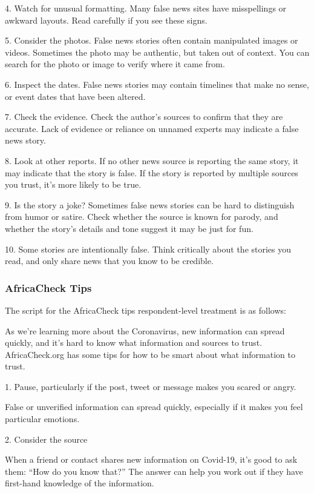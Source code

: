 \documentclass[letterpaper, 12pt, parskip=full,]{scrartcl}
\begin{document}
4. Watch for unusual formatting. Many false news sites have misspellings or awkward layouts. Read carefully if you see these signs.

5. Consider the photos. False news stories often contain manipulated images or videos. Sometimes the photo may be authentic, but taken out of context. You can search for the photo or image to verify where it came from.

6. Inspect the dates. False news stories may contain timelines that make no sense, or event dates that have been altered.

7. Check the evidence. Check the author's sources to confirm that they are accurate. Lack of evidence or reliance on unnamed experts may indicate a false news story.

8. Look at other reports. If no other news source is reporting the same story, it may indicate that the story is false. If the story is reported by multiple sources you trust, it's more likely to be true.

9. Is the story a joke? Sometimes false news stories can be hard to distinguish from humor or satire. Check whether the source is known for parody, and whether the story's details and tone suggest it may be just for fun.

10. Some stories are intentionally false. Think critically about the stories you read, and only share news that you know to be credible.



\subsubsection{AfricaCheck Tips}\label{sec:actips}
The script for the AfricaCheck tips respondent-level treatment is as follows:

As we're learning more about the Coronavirus, new information can spread quickly, and it's hard to know what information and sources to trust. AfricaCheck.org has some tips for how to be smart about what information to trust. 

1. Pause, particularly if the post, tweet or message makes you scared or angry. 

False or unverified information can spread quickly, especially if it makes you feel particular emotions.

2. Consider the source

When a friend or contact shares new information on Covid-19, it’s good to ask them: “How do you know that?” The answer can help you work out if they have first-hand knowledge of the information.
\end{document}
